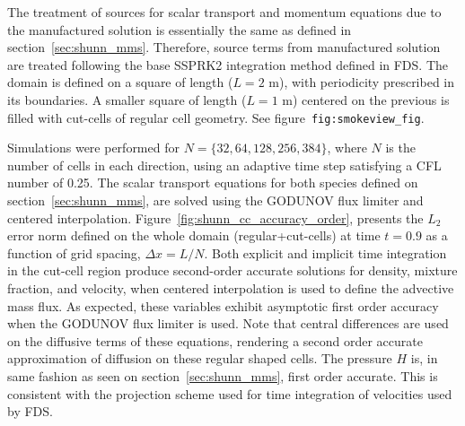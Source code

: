 \documentclass[11pt]{book}
\begin{document}
The treatment of sources for scalar transport and momentum equations due to the manufactured solution is essentially the same as defined in section~\ref{sec:shunn_mms}. Therefore, source terms from manufactured solution are treated following the base SSPRK2 integration method defined in FDS.
The domain is defined on a square of length ($L=2$ m), with periodicity prescribed in its boundaries. A smaller square of length ($L=1$ m) centered on the previous is filled with cut-cells of regular cell geometry. See figure~\texttt{fig:smokeview\_fig}.




Simulations were performed for $N = \{32, 64, 128, 256, 384\}$, where $N$ is the number of cells in each direction, using an adaptive time step satisfying a CFL number of 0.25. The scalar transport equations for both species defined on section~\ref{sec:shunn_mms}, are solved using the GODUNOV flux limiter and centered interpolation. Figure~\ref{fig:shunn_cc_accuracy_order}, presents the $L_2$ error norm defined on the whole domain (regular+cut-cells) at time $t = 0.9$ as a function of grid spacing, $\Delta x = L/N$. Both explicit and implicit time integration in the cut-cell region produce second-order accurate solutions for density, mixture fraction, and velocity, when centered interpolation is used to define the advective mass flux. As expected, these variables exhibit asymptotic first order accuracy when the GODUNOV flux limiter is used. Note that central differences are used on the diffusive terms of these equations, rendering a second order accurate approximation of diffusion on these regular shaped cells. The pressure $H$ is, in same fashion as seen on section~\ref{sec:shunn_mms}, first order accurate. This is consistent with the projection scheme used for time integration of velocities used by FDS.
\end{document}
